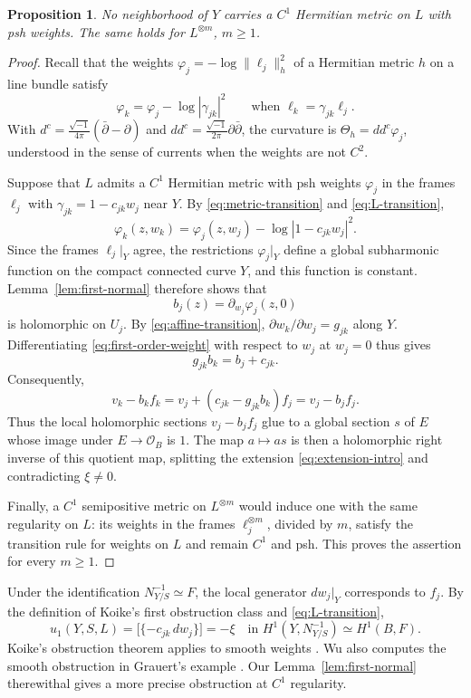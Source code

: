 \documentclass[11pt]{amsart}
\newtheorem{proposition}[theorem]{Proposition}
\theoremstyle{definition}
\theoremstyle{remark}
\numberwithin{equation}{section}
\newcommand{\OO}{\mathcal O}
\newcommand{\ddc}{dd^c}
\newcommand{\barp}{\bar\partial}
\begin{document}
\begin{proposition}\label{prop:no-metric}
No neighborhood of $Y$ carries a $C^1$ Hermitian metric on $L$
with psh weights. The same holds for $L^{\otimes m}$, $m\ge1$.
\end{proposition}
\begin{proof}
Recall that the weights $\varphi_j=-\log\|\ell_j\|_h^2$ of a
Hermitian metric $h$ on a line bundle satisfy
\begin{equation}\label{eq:metric-transition}
 \varphi_k=\varphi_j-\log|\gamma_{jk}|^2
 \qquad\text{when }\ell_k=\gamma_{jk}\ell_j.
\end{equation}
With $d^c=\tfrac{\sqrt{-1}}{4\pi}(\barp-\partial)$ and
$\ddc=\tfrac{\sqrt{-1}}{2\pi}\partial\barp$, the curvature is
$\Theta_h=\ddc\varphi_j$, understood in the sense of
currents when the weights are not $C^2$.

Suppose that $L$ admits a $C^1$ Hermitian metric with psh
weights $\varphi_j$ in the frames $\ell_j$ with $\gamma_{jk}=1-c_{jk}w_j$ near $Y$.
By \eqref{eq:metric-transition} and \eqref{eq:L-transition},
\begin{equation}\label{eq:first-order-weight}
 \varphi_k(z,w_k)
 =\varphi_j(z,w_j)-\log|1-c_{jk}w_j|^2.
\end{equation}
Since the frames $\ell_j|_Y$ agree, the restrictions
$\varphi_j|_Y$ define a global subharmonic function on the
compact connected curve $Y$, and this function is constant.
Lemma~\ref{lem:first-normal} therefore shows that
\[
 b_j(z)=\partial_{w_j}\varphi_j(z,0)
\]
is holomorphic on $U_j$.
By \eqref{eq:affine-transition},
$\partial w_k/\partial w_j=g_{jk}$ along $Y$.
Differentiating \eqref{eq:first-order-weight} with respect
to $w_j$ at $w_j=0$ thus gives
\[
 g_{jk}b_k=b_j+c_{jk}.
\]
Consequently,
\[
 v_k-b_kf_k
 =v_j+(c_{jk}-g_{jk}b_k)f_j
 =v_j-b_jf_j.
\]
Thus the local holomorphic sections $v_j-b_jf_j$ glue to
a global section $s$ of $E$ whose image under
$E\to\OO_B$ is $1$. The map $a\mapsto as$ is then a
holomorphic right inverse of this quotient map, splitting
the extension \eqref{eq:extension-intro} and contradicting
$\xi\ne0$.

Finally, a $C^1$ semipositive metric on $L^{\otimes m}$
would induce one with the same regularity on $L$: its weights in the frames
$\ell_j^{\otimes m}$, divided by $m$, satisfy the transition
rule for weights on $L$ and remain $C^1$ and psh.
This proves the assertion for every $m\ge1$.
\end{proof}

Under the identification $N_{Y/S}^{-1}\simeq F$, the local generator
$dw_j|_Y$ corresponds to $f_j$. By the definition of Koike's first obstruction class
\cite[\S3.2, p.~2247]{Koike2021} and \eqref{eq:L-transition},
\[
 u_1(Y,S,L)=\bigl[\{-c_{jk}\,dw_j\}\bigr]=-\xi
 \quad\text{in }H^1(Y,N_{Y/S}^{-1})\simeq H^1(B,F).
\]
Koike's obstruction theorem applies to smooth weights
\cite[Theorem~1.4]{Koike2021}. Wu also computes the smooth
obstruction in Grauert's example \cite[Example~3.7]{Wu2026}.
Our Lemma~\ref{lem:first-normal} therewithal gives a more precise obstruction at $C^1$ regularity.
\end{document}
